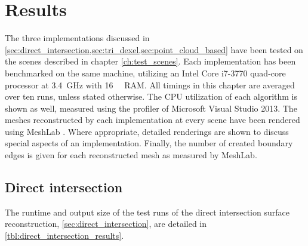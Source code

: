 
\begingroup
\renewcommand{\textfraction}{1.0}
\renewcommand{\floatpagefraction}{0.9}

\chapter{Results}
\label{ch:results}

The three implementations discussed in \cref{sec:direct_intersection,sec:tri_dexel,sec:point_cloud_based} have been tested on the scenes described in chapter \cref{ch:test_scenes}.
Each implementation has been benchmarked on the same machine, utilizing an Intel Core i7-3770 quad-core processor at \SI{3.4}{\giga\hertz} with \SI{16}{\gibi\byte} RAM.
All timings in this chapter are averaged over ten runs, unless stated otherwise.
The CPU utilization of each algorithm is shown as well, measured using the profiler of Microsoft Visual Studio 2013.
The meshes reconstructed by each implementation at every scene have been rendered using MeshLab \cite{meshlab}.
Where appropriate, detailed renderings are shown to discuss special aspects of an implementation.
Finally, the number of created boundary edges is given for each reconstructed mesh as measured by MeshLab.


\section{Direct intersection}
\label{sec:direct_intersection_results}

The runtime and output size of the test runs of the direct intersection surface reconstruction, \cf \cref{sec:direct_intersection}, are detailed in \cref{tbl:direct_intersection_results}.

